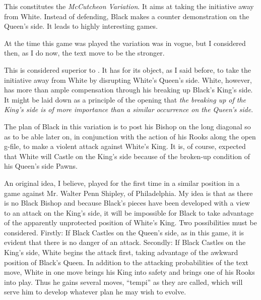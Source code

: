 \documentclass[10pt,twoside]{article}
\begin{document}
This constitutes the \emph{McCutcheon Variation}. It aims at taking the initiative away from White. Instead of defending, Black makes a counter demonstration on the Queen's side. It leads to highly interesting games.


At the time this game was played the variation  was in vogue, but I considered then, as I do now, the text move to be the stronger.


This is considered superior to . It has for its object, as I said before, to take the initiative away from White by disrupting White's Queen's side. White, however, has more than ample compensation through his breaking up Black's King's side. It might be laid down as a principle of the opening that \emph{the breaking up of the King's side is of more importance than a similar occurrence on the Queen's side}.


The plan of Black in this variation is to post his Bishop on the long diagonal so as to be able later on, in conjunction with the action of his Rooks along the open g-file, to make a violent attack against White's King. It is, of course, expected that White will Castle on the King's side because of the broken-up condition of his Queen's side Pawns.


An original idea, I believe, played for the first time in a similar position in a game against Mr. Walter Penn Shipley, of Philadelphia. My idea is that as there is no Black Bishop and because Black's pieces have been developed with a view to an attack on the King's side, it will be impossible for Black to take advantage of the apparently unprotected position of White's King. Two possibilities must be considered. Firstly: If Black Castles on the Queen's side, as in this game, it is evident that there is no danger of an attack. Secondly: If Black Castles on the King's side, White begins the attack first, taking advantage of the awkward position of Black's Queen. In addition to the attacking probabilities of the text move, White in one move brings his King into safety and brings one of his Rooks into play. Thus he gains several moves, ``tempi'' as they are called, which will serve him to develop whatever plan he may wish to evolve.

\end{document}
